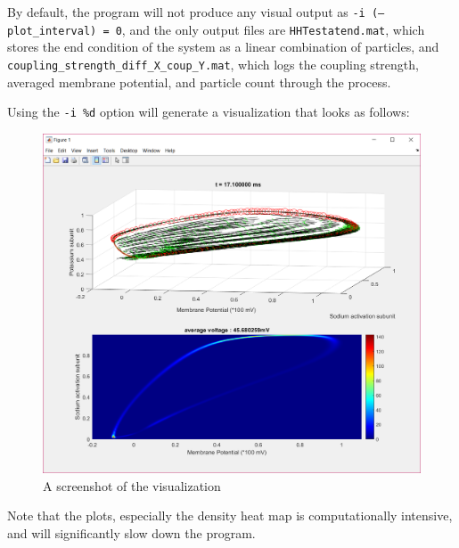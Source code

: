 \documentclass[10pt]{article} %
\begin{document}
By default, the program will not produce any visual output as \texttt{-i (--plot\_interval) = 0}, and the only output files are \texttt{HHTestatend.mat}, which stores the end condition of the system as a linear combination of particles, and \texttt{coupling\_strength\_diff\_X\_coup\_Y.mat}, which logs the coupling strength, averaged membrane potential, and particle count through the process. 

Using the \texttt{-i \%d} option will generate a visualization that looks as follows: 
\begin{figure}[H]
\includegraphics[width=\textwidth]{visualization_screenshot}
\caption{A screenshot of the visualization}
\end{figure}
Note that the plots, especially the density heat map is computationally intensive, and will significantly slow down the program. 
\end{document}
